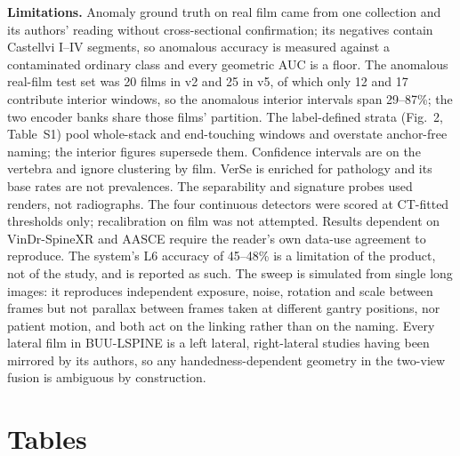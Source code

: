 \documentclass[11pt,letterpaper]{article}
\begin{document}
\textbf{Limitations.} Anomaly ground truth on real film came from one collection and its authors' reading without cross-sectional confirmation; its negatives contain Castellvi I--IV segments, so anomalous accuracy is measured against a contaminated ordinary class and every geometric AUC is a floor. The anomalous real-film test set was 20 films in v2 and 25 in v5, of which only 12 and 17 contribute interior windows, so the anomalous interior intervals span 29--87\%; the two encoder banks share those films' partition. The label-defined strata (Fig.~2, Table~S1) pool whole-stack and end-touching windows and overstate anchor-free naming; the interior figures supersede them. Confidence intervals are on the vertebra and ignore clustering by film. VerSe is enriched for pathology and its base rates are not prevalences. The separability and signature probes used renders, not radiographs. The four continuous detectors were scored at CT-fitted thresholds only; recalibration on film was not attempted. Results dependent on VinDr-SpineXR and AASCE require the reader's own data-use agreement to reproduce. The system's L6 accuracy of 45--48\% is a limitation of the product, not of the study, and is reported as such. The sweep is simulated from single long images: it reproduces independent exposure, noise, rotation and scale between frames but not parallax between frames taken at different gantry positions, nor patient motion, and both act on the linking rather than on the naming. Every lateral film in BUU-LSPINE is a left lateral, right-lateral studies having been mirrored by its authors, so any handedness-dependent geometry in the two-view fusion is ambiguous by construction.

\section*{Tables}


\begin{table}[htbp]\centering
\caption{The training corpus, counted in distinct patients rather than crops, because a rare class is
learned from people and one spine is rendered from many poses. \emph{Pixels} distinguishes a photograph from
a rendering of a CT; \emph{name from} distinguishes a name taken from a labelled volume, from a collection's
own annotation, and from a decoder's output. Generated by \texttt{tools/fig\_dataset.py}.}
\label{tab:dataset}
\resizebox{\textwidth}{!}{}
\end{table}
\end{document}
